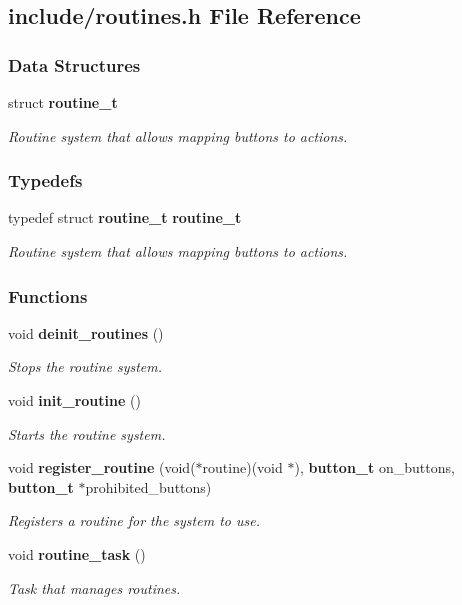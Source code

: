 \subsection{include/routines.h File Reference}
\label{routines_8h}
\subsubsection*{Data Structures}
\begin{DoxyCompactItemize}
\item 
struct \textbf{ routine\+\_\+t}
\begin{DoxyCompactList}\small\item\em Routine system that allows mapping buttons to actions. \end{DoxyCompactList}\end{DoxyCompactItemize}
\subsubsection*{Typedefs}
\begin{DoxyCompactItemize}
\item 
typedef struct \textbf{ routine\+\_\+t} \textbf{ routine\+\_\+t}
\begin{DoxyCompactList}\small\item\em Routine system that allows mapping buttons to actions. \end{DoxyCompactList}\end{DoxyCompactItemize}
\subsubsection*{Functions}
\begin{DoxyCompactItemize}
\item 
void \textbf{ deinit\+\_\+routines} ()
\begin{DoxyCompactList}\small\item\em Stops the routine system. \end{DoxyCompactList}\item 
void \textbf{ init\+\_\+routine} ()
\begin{DoxyCompactList}\small\item\em Starts the routine system. \end{DoxyCompactList}\item 
void \textbf{ register\+\_\+routine} (void($\ast$routine)(void $\ast$), \textbf{ button\+\_\+t} on\+\_\+buttons, \textbf{ button\+\_\+t} $\ast$prohibited\+\_\+buttons)
\begin{DoxyCompactList}\small\item\em Registers a routine for the system to use. \end{DoxyCompactList}\item 
void \textbf{ routine\+\_\+task} ()
\begin{DoxyCompactList}\small\item\em Task that manages routines. \end{DoxyCompactList}\end{DoxyCompactItemize}


